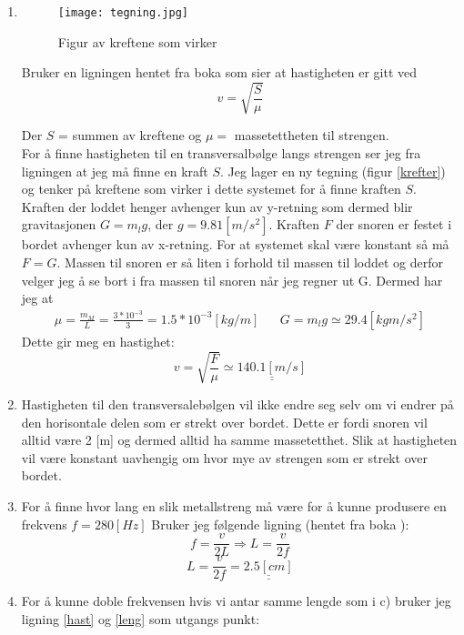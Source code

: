 \documentclass[a4paper,12pt,norsk]{article}
\newcommand{\uu}{\underline}
\begin{document}
\begin{enumerate}[label = \alph*)]
\item
\begin{figure}
\centering
\texttt{[image: tegning.jpg]}
\caption[Kraft illustrasjon]{Figur av kreftene som virker}
\label{krefter}
\end{figure}
Bruker en ligningen hentet fra boka \cite{boka} som sier at hastigheten er gitt ved 
\begin{equation}
v = \sqrt{\frac{S}{\mu}}
\label{hast}
\end{equation}

Der $S$ = summen av kreftene og $\mu =$ massetettheten til strengen. \\
For å finne hastigheten til en transversalbølge langs strengen ser jeg fra ligningen at jeg må finne en kraft $S$. Jeg lager en ny tegning (figur \vref{krefter}) og tenker på kreftene som virker i dette systemet for å finne kraften $S$.
Kraften der loddet henger avhenger kun av y-retning som dermed blir gravitasjonen $G=m_lg$, der $g = 9.81 [m/s^2]$. Kraften $F$ der snoren er festet i bordet avhenger kun av x-retning. For at systemet skal være konstant så må $F=G$. Massen til snoren er så liten i forhold til massen til loddet og derfor velger jeg å se bort i fra massen til snoren når jeg regner ut G. Dermed har jeg at 
\begin{align*}
\mu = \frac{m_M}{L} = \frac{3*10^{-3}}{3} = 1.5*10^{-3} [kg/m] && G = m_lg \simeq 29.4 [kgm/s^2]
\end{align*}
Dette gir meg en hastighet:
$$
v = \sqrt{\frac{F}{\mu}} \simeq \uu{\uu{140.1 [m/s]}}
$$
\item
Hastigheten til den transversalebølgen vil ikke endre seg selv om vi endrer på den horisontale delen som er strekt over bordet. Dette er fordi snoren vil alltid være 2 [m] og dermed alltid ha samme massetetthet. Slik at hastigheten vil være konstant uavhengig om hvor mye av strengen som er strekt over bordet.
\item
For å finne hvor lang en slik metallstreng må være for å kunne produsere en frekvens $f=280 [Hz]$ Bruker jeg følgende ligning (hentet fra boka \cite{boka}):
\begin{equation}
f = \frac{v}{2L} \Rightarrow L = \frac{v}{2f}
\label{leng}
\end{equation}
$$
L = \frac{v}{2f} = \uu{\uu{2.5[cm]}}
$$
\item
For å kunne doble frekvensen hvis vi antar samme lengde som i c) bruker jeg ligning \ref{hast} og \ref{leng} som utgangs punkt:


\end{enumerate}
\end{document}
